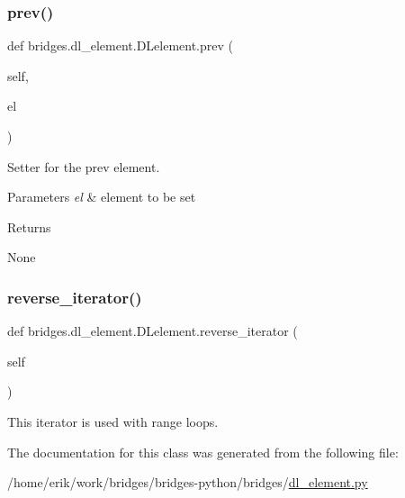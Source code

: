 \subsubsection{\texorpdfstring{prev()}{prev()}\hspace{0.1cm}{\footnotesize\ttfamily [2/2]}}
{\footnotesize\ttfamily def bridges.\+dl\+\_\+element.\+D\+Lelement.\+prev (\begin{DoxyParamCaption}\item[{}]{self,  }\item[{}]{el }\end{DoxyParamCaption})}



Setter for the prev element. 


\begin{DoxyParams}{Parameters}
{\em el} & element to be set\\
\hline
\end{DoxyParams}
\begin{DoxyReturn}{Returns}


None 
\end{DoxyReturn}
\mbox{\label{classbridges_1_1dl__element_1_1_d_lelement_a2baa040819283ef3adcda70b630de421}} 
\subsubsection{\texorpdfstring{reverse\+\_\+iterator()}{reverse\_iterator()}}
{\footnotesize\ttfamily def bridges.\+dl\+\_\+element.\+D\+Lelement.\+reverse\+\_\+iterator (\begin{DoxyParamCaption}\item[{}]{self }\end{DoxyParamCaption})}



This iterator is used with range loops. 



The documentation for this class was generated from the following file\+:\begin{DoxyCompactItemize}
\item 
/home/erik/work/bridges/bridges-\/python/bridges/\hyperlink{dl__element_8py}{dl\+\_\+element.\+py}\end{DoxyCompactItemize}
